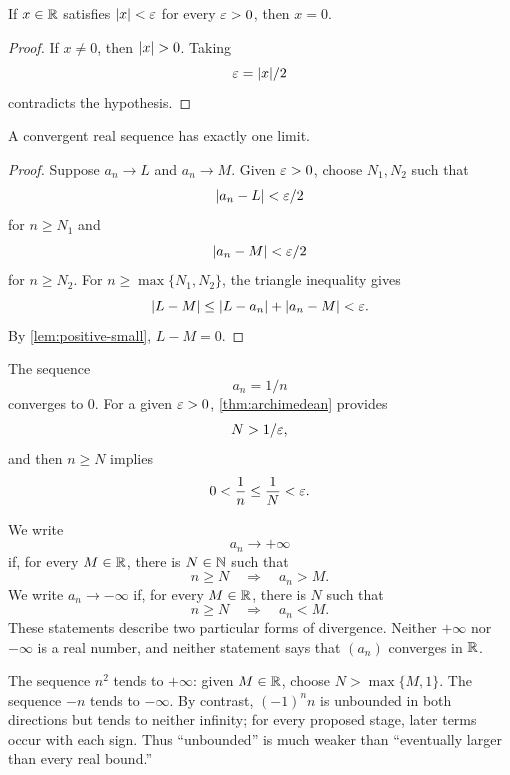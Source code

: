 \begin{lemma}
\label{lem:positive-small}
If $x\in\mathbb{R}$ satisfies $\lvert x\rvert<\varepsilon$ for every $\varepsilon>0$, then $x=0$.
\end{lemma}
\begin{proof}
If $x\ne0$, then $\lvert x\rvert>0$. Taking
\[
\varepsilon=\lvert x\rvert/2
\]
 contradicts the hypothesis.
\end{proof}

\begin{theorem}
\label{thm:unique-sequence-limit}
A convergent real sequence has exactly one limit.
\end{theorem}
\begin{proof}
Suppose $a_n\to L$ and $a_n\to M$. Given $\varepsilon>0$, choose $N_1,N_2$ such that
\[
\lvert a_n-L\rvert<\varepsilon/2
\]
 for $n\geq N_1$ and
\[
\lvert a_n-M\rvert<\varepsilon/2
\]
 for $n\geq N_2$. For $n\geq\max\{N_1,N_2\}$, the triangle inequality gives
\[
\lvert L-M\rvert\leq\lvert L-a_n\rvert+\lvert a_n-M\rvert<\varepsilon.
\]
By \cref{lem:positive-small}, $L-M=0$.
\end{proof}

\begin{example}
The sequence
\[
a_n=1/n
\]
 converges to $0$. For a given $\varepsilon>0$, \cref{thm:archimedean} provides
\[
N>1/\varepsilon,
\]
 and then $n\geq N$ implies
\[
0<\frac1n\leq\frac1N<\varepsilon.
\]
\end{example}

\begin{definition}
\label{def:sequence-infinite-limit}
We write
\[
a_n\longrightarrow+\infty
\]
if, for every $M\in\mathbb{R}$, there is $N\in\mathbb{N}$ such that
\[
n\geq N\quad\Longrightarrow\quad a_n>M.
\]
We write $a_n\to-\infty$ if, for every $M\in\mathbb{R}$, there is $N$ such that
\[
n\geq N\quad\Longrightarrow\quad a_n<M.
\]
These statements describe two particular forms of divergence.  Neither
$+\infty$ nor $-\infty$ is a real number, and neither statement says that
$(a_n)$ converges in $\mathbb{R}$.
\end{definition}

\begin{example}
The sequence $n^2$ tends to $+\infty$: given $M\in\mathbb{R}$, choose
$N>\max\{M,1\}$.  The sequence $-n$ tends to $-\infty$.  By contrast,
$(-1)^n n$ is unbounded in both directions but tends to neither infinity;
for every proposed stage, later terms occur with each sign.  Thus
``unbounded'' is much weaker than ``eventually larger than every real
bound.''
\end{example}

